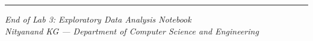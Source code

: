 \documentclass[11pt]{article}
\begin{document}
\begin{center}\rule{0.5\linewidth}{0.5pt}\end{center}

\emph{End of Lab 3: Exploratory Data Analysis Notebook}\\
\emph{Nityanand KG --- Department of Computer Science and Engineering}


    
    
    
\end{document}
